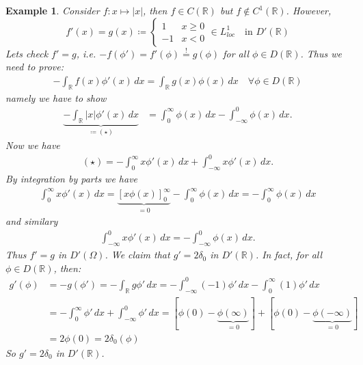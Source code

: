 \documentclass{report}
\theoremstyle{tommy}
\newtheorem{eg}[defn]{Example}
\begin{document}
  \begin{eg}
    Consider \(f: x \mapsto |x|\), then \(f \in C(\mathbb{R})\) but \(f \notin C^1(\mathbb{R})\). However, 
    \[f'(x) = g(x) \coloneqq \begin{cases}
      1 & x \ge 0 \\ -1 &x < 0
    \end{cases} \in L_{loc}^1 \quad \text{in } D'(\mathbb{R})\]
    Lets check \(f' = g\), i.e. \(-f(\phi') = f'(\phi) \overset{!}{=} g(\phi)\) for all \(\phi \in D(\mathbb{R})\). Thus we need to prove:
    \begin{align*}
      - \int_{\mathbb{R}} f(x) \phi'(x) \, dx = \int_{\mathbb{R}} g(x) \phi(x) \, dx \quad \forall \phi \in D(\mathbb{R})
    \end{align*}
    namely we have to show
    \begin{align*}
      \underbrace{- \int_{\mathbb{R}} |x| \phi'(x) \, dx}_{\coloneqq (\star)} &= \int_0^\infty \phi(x) \, dx - \int_{-\infty}^0 \phi(x) \, dx.
    \end{align*}
    Now we have
    \begin{align*}
      (\star) = - \int_0^\infty x \phi'(x) \, dx + \int_{-\infty}^0 x \phi'(x) \, dx.
    \end{align*}
    By integration by parts we have
    \begin{align*}
      \int_0^\infty x \phi'(x) \, dx = \underbrace{[x \phi(x)]_0^\infty}_{= 0} - \int_0^\infty \phi(x) \, dx = - \int_0^\infty \phi(x) \, dx
    \end{align*}
    and similary
    \begin{align*}
      \int_{-\infty}^0 x \phi'(x) \, dx = - \int_{-\infty}^0 \phi(x) \, dx.
    \end{align*}
    Thus \(f' = g\) in \(D'(\Omega)\). We claim that \(g' = 2 \delta_0\) in \(D'(\mathbb{R})\). In fact, for all \(\phi \in D(\mathbb{R})\), then:
    \begin{align*}
      g'(\phi) 
      &= - g(\phi') 
      = - \int_{\mathbb{R}} g\phi' \, dx
      = - \int_{-\infty}^0 (-1) \phi'  \, dx - \int_0^\infty (1) \phi'  \, dx \\
      &= - \int_0^\infty \phi'  \, dx + \int_{-\infty}^0 \phi' \, dx 
      = [\phi(0) - \underbrace{\phi(\infty)}_{= 0}] + [\phi(0) - \underbrace{\phi(-\infty)}_{= 0}]\\
      &= 2 \phi(0) = 2 \delta_0 (\phi)
    \end{align*}
    So \(g' = 2 \delta_0\) in \(D'(\mathbb{R})\).
  \end{eg}
\end{document}
